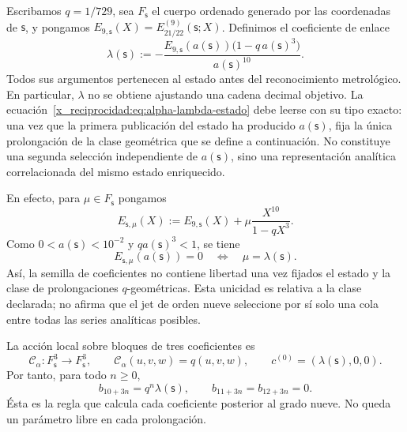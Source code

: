 Escribamos \(q=1/729\), sea \(F_{\mathsf s}\) el cuerpo ordenado generado por
las coordenadas de \(\mathsf s\), y pongamos
\(E_{9,\mathsf s}(X)=E_{21/22}^{(9)}(\mathsf s;X)\). Definimos el coeficiente
de enlace
\begin{equation}
 \lambda(\mathsf s):=
 -\frac{E_{9,\mathsf s}(a(\mathsf s))
         \bigl(1-q\,a(\mathsf s)^3\bigr)}{a(\mathsf s)^{10}}.
 \label{x_reciprocidad:eq:alpha-lambda-estado}
\end{equation}
Todos sus argumentos pertenecen al estado antes del reconocimiento
metrológico. En particular, \(\lambda\) no se obtiene ajustando una cadena
decimal objetivo. La ecuación~\eqref{x_reciprocidad:eq:alpha-lambda-estado} debe leerse con
su tipo exacto: una vez que la primera publicación del estado ha producido
\(a(\mathsf s)\), fija la única prolongación de la clase geométrica que se
define a continuación. No constituye una segunda selección independiente de
\(a(\mathsf s)\), sino una representación analítica correlacionada del mismo
estado enriquecido.

En efecto, para \(\mu\in F_{\mathsf s}\) pongamos
\[
 E_{\mathsf s,\mu}(X)
 :=E_{9,\mathsf s}(X)+\mu\frac{X^{10}}{1-qX^3}.
\]
Como \(0<a(\mathsf s)<10^{-2}\) y \(qa(\mathsf s)^3<1\), se tiene
\begin{equation}
 E_{\mathsf s,\mu}(a(\mathsf s))=0
 \quad\Longleftrightarrow\quad
 \mu=\lambda(\mathsf s).
 \label{x_reciprocidad:eq:alpha-unicidad-lambda-clase-geometrica}
\end{equation}
Así, la semilla de coeficientes no contiene libertad una vez fijados el estado
y la clase de prolongaciones \(q\)-geométricas. Esta unicidad es relativa a la
clase declarada; no afirma que el jet de orden nueve seleccione por sí solo una
cola entre todas las series analíticas posibles.

La acción local sobre bloques de tres coeficientes es
\begin{equation}
 \mathcal C_\alpha:F_{\mathsf s}^{3}\longrightarrow F_{\mathsf s}^{3},
 \qquad \mathcal C_\alpha(u,v,w)=q(u,v,w),
 \qquad c^{(0)}=(\lambda(\mathsf s),0,0).
 \label{x_reciprocidad:eq:alpha-accion-coeficientes}
\end{equation}
Por tanto, para todo \(n\geq0\),
\begin{equation}
 b_{10+3n}=q^n\lambda(\mathsf s),\qquad
 b_{11+3n}=b_{12+3n}=0.
 \label{x_reciprocidad:eq:alpha-recurrencia-coeficientes}
\end{equation}
Ésta es la regla que calcula cada coeficiente posterior al grado nueve. No
queda un parámetro libre en cada prolongación.

